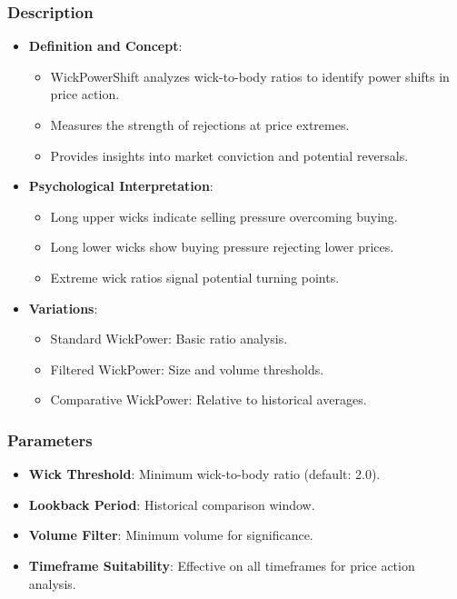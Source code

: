 \documentclass[12pt]{article}
\begin{document}
\subsubsection{Description}
\begin{itemize}
\item \textbf{Definition and Concept}:
  \begin{itemize}
  \item WickPowerShift analyzes wick-to-body ratios to identify power shifts in price action.
  \item Measures the strength of rejections at price extremes.
  \item Provides insights into market conviction and potential reversals.
  \end{itemize}
\item \textbf{Psychological Interpretation}:
  \begin{itemize}
  \item Long upper wicks indicate selling pressure overcoming buying.
  \item Long lower wicks show buying pressure rejecting lower prices.
  \item Extreme wick ratios signal potential turning points.
  \end{itemize}
\item \textbf{Variations}:
  \begin{itemize}
  \item Standard WickPower: Basic ratio analysis.
  \item Filtered WickPower: Size and volume thresholds.
  \item Comparative WickPower: Relative to historical averages.
  \end{itemize}
\end{itemize}

\subsubsection{Parameters}
\begin{itemize}
\item \textbf{Wick Threshold}: Minimum wick-to-body ratio (default: 2.0).
\item \textbf{Lookback Period}: Historical comparison window.
\item \textbf{Volume Filter}: Minimum volume for significance.
\item \textbf{Timeframe Suitability}: Effective on all timeframes for price action analysis.
\end{itemize}
\end{document}
